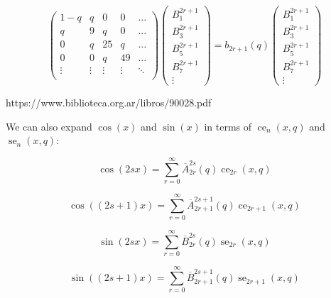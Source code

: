 \documentclass{article}
\DeclareMathOperator{\ce}{ce}
\DeclareMathOperator{\se}{se}
\begin{document}
\begin{equation}
    \left(
    \begin{matrix}
        1-q & q & 0 & 0 & \dots \\
        q & 9 & q & 0 & \dots \\
        0 & q & 25 & q & \dots \\
        0 & 0 & q & 49 & \dots \\
        \vdots & \vdots & \vdots & \vdots & \ddots \\

    \end{matrix}
    \right)
    \left(
    \begin{matrix}
        B_1^{2r+1} \\
        B_3^{2r+1}\\
        B_5^{2r+1}\\
        B_7^{2r+1}\\
        \vdots
    \end{matrix}
    \right)
    = b_{2r+1}(q)
    \left(
        \begin{matrix}
            B_1^{2r+1} \\
            B_3^{2r+1}\\
            B_5^{2r+1}\\
            B_7^{2r+1}\\
            \vdots
        \end{matrix}
    \right)
\end{equation}

https://www.biblioteca.org.ar/libros/90028.pdf

We can also expand $\cos(x)$ and $\sin(x)$ in terms of $\ce_n(x, q)$ and $\se_n(x, q)$:

\begin{equation}
    \cos(2sx) = \sum_{r=0}^\infty \overline{A}_{2r}^{2s}(q)\ce_{2r}(x,q)  
\end{equation}

\begin{equation}
    \cos((2s+1)x) = \sum_{r=0}^\infty \overline{A}_{2r+1}^{2s+1}(q)\ce_{2r+1}(x,q)  
\end{equation}

\begin{equation}
    \sin(2sx) = \sum_{r=0}^\infty \overline{B}_{2r}^{2s}(q)\se_{2r}(x,q)  
\end{equation}

\begin{equation}
    \sin((2s+1)x) = \sum_{r=0}^\infty \overline{B}_{2r+1}^{2s+1}(q)\se_{2r+1}(x,q)  
\end{equation}
\end{document}
